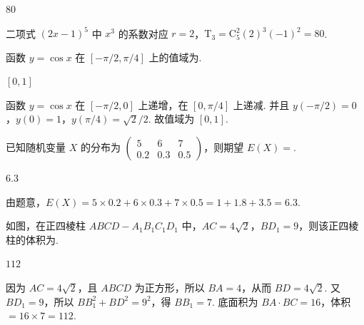 \begin{answer}
\(80\)
\end{answer}

\begin{solution}
二项式 \((2x-1)^5\) 中 \(x^3\) 的系数对应 \(r=2\)，\(\mathrm{T}_{3}=\mathrm C_5^2(2)^3(-1)^2=80\).
\end{solution}

\begin{problem}
函数 \(y=\cos x\) 在 \([-\pi/2,\pi/4]\) 上的值域为\fillinblank{}.
\end{problem}

\begin{answer}
\([0,1]\)
\end{answer}

\begin{solution}
函数 \(y=\cos x\) 在 \([-\pi/2,0]\) 上递增，在 \([0,\pi/4]\) 上递减. 并且 \(y(-\pi/2)=0\)，\(y(0)=1\)，\(y(\pi/4)=\sqrt2/2\). 故值域为 \([0,1]\).
\end{solution}

\begin{problem}
已知随机变量 \(X\) 的分布为
\(\begin{pmatrix}5&6&7\\0.2&0.3&0.5\end{pmatrix}\)，则期望 \(E(X)=\)\fillinblank{}.
\end{problem}

\begin{answer}
\(6.3\)
\end{answer}

\begin{solution}
由题意，\(E(X)=5\times0.2+6\times0.3+7\times0.5=1+1.8+3.5=6.3\).
\end{solution}

\begin{problem}
如图，在正四棱柱 \(ABCD-A_1B_1C_1D_1\) 中，\(AC=4\sqrt2\)，\(BD_1=9\)，则该正四棱柱的体积为\fillinblank{}.

\end{problem}

\begin{answer}
\(112\)
\end{answer}

\begin{solution}
因为 \(AC=4\sqrt2\)，且 \(ABCD\) 为正方形，所以 \(BA=4\)，从而 \(BD=4\sqrt2\). 又 \(BD_1=9\)，所以 \(BB_1^2+BD^2=9^2\)，得 \(BB_1=7\). 底面积为 \(BA\cdot BC=16\)，体积 \(=16\times7=112\).
\end{solution}

